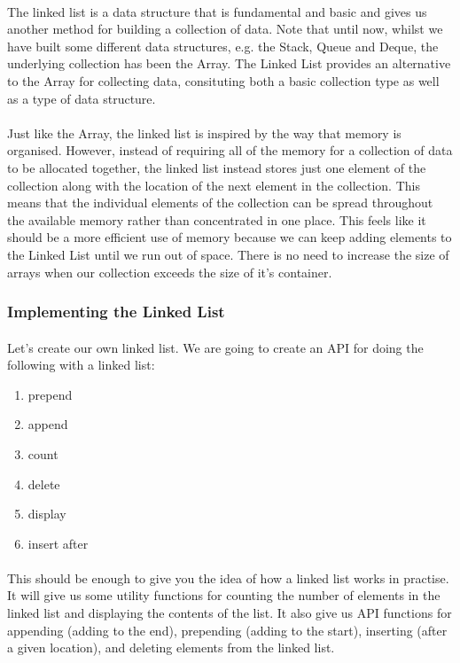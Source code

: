 \documentclass[10pt, a4paper, twosize]{article}
\begin{document}
\paragraph{} The linked list is a data structure that is fundamental and basic and gives us another method for building a collection of data. Note that until now, whilst we have built some different data structures, e.g. the Stack, Queue and Deque, the underlying collection has been the Array. The Linked List provides an alternative to the Array for collecting data, consituting both a basic collection type as well as a type of data structure. 

\paragraph{} Just like the Array, the linked list is inspired by the way that memory is organised. However, instead of requiring all of the memory for a collection of data to be allocated together, the linked list instead stores just one element of the collection along with the location of the next element in the collection. This means that the individual elements of the collection can be spread throughout the available memory rather than concentrated in one place. This feels like it should be a more efficient use of memory because we can keep adding elements to the Linked List until we run out of space. There is no need to increase the size of arrays when our collection exceeds the size of it's container.

\subsubsection{Implementing the Linked List}

\paragraph{} Let's create our own linked list. We are going to create an API for doing the following with a linked list:

\begin{enumerate}
\item prepend
\item append
\item count
\item delete
\item display
\item insert after
\end{enumerate}
\paragraph{} This should be enough to give you the idea of how a linked list works in practise. It will give us some utility functions for counting the number of elements in the linked list and displaying the contents of the list. It also give us API functions for appending (adding to the end), prepending (adding to the start), inserting (after a given location), and deleting elements from the linked list.
\end{document}
